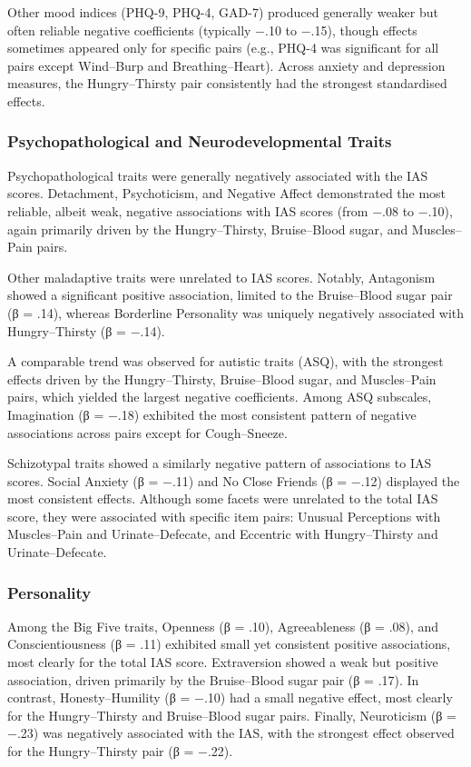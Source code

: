 \documentclass[
  jou,
  floatsintext,
  longtable,
  nolmodern,
  notxfonts,
  notimes,
  colorlinks=true,linkcolor=blue,citecolor=blue,urlcolor=blue]{apa7}
\begin{document}
Other mood indices (PHQ-9, PHQ-4, GAD-7) produced generally weaker but
often reliable negative coefficients (typically −.10 to −.15), though
effects sometimes appeared only for specific pairs (e.g., PHQ-4 was
significant for all pairs except Wind--Burp and Breathing--Heart).
Across anxiety and depression measures, the Hungry--Thirsty pair
consistently had the strongest standardised effects.

\subsubsection{Psychopathological and Neurodevelopmental
Traits}\label{psychopathological-and-neurodevelopmental-traits-1}

Psychopathological traits were generally negatively associated with the
IAS scores. Detachment, Psychoticism, and Negative Affect demonstrated
the most reliable, albeit weak, negative associations with IAS scores
(from −.08 to −.10), again primarily driven by the Hungry--Thirsty,
Bruise--Blood sugar, and Muscles--Pain pairs.

Other maladaptive traits were unrelated to IAS scores. Notably,
Antagonism showed a significant positive association, limited to the
Bruise--Blood sugar pair (β = .14), whereas Borderline Personality was
uniquely negatively associated with Hungry--Thirsty (β = −.14).

A comparable trend was observed for autistic traits (ASQ), with the
strongest effects driven by the Hungry--Thirsty, Bruise--Blood sugar,
and Muscles--Pain pairs, which yielded the largest negative
coefficients. Among ASQ subscales, Imagination (β = −.18) exhibited the
most consistent pattern of negative associations across pairs except for
Cough--Sneeze.

Schizotypal traits showed a similarly negative pattern of associations
to IAS scores. Social Anxiety (β = −.11) and No Close Friends (β = −.12)
displayed the most consistent effects. Although some facets were
unrelated to the total IAS score, they were associated with specific
item pairs: Unusual Perceptions with Muscles--Pain and
Urinate--Defecate, and Eccentric with Hungry--Thirsty and
Urinate--Defecate.

\subsubsection{Personality}\label{personality-1}

Among the Big Five traits, Openness (β = .10), Agreeableness (β = .08),
and Conscientiousness (β = .11) exhibited small yet consistent positive
associations, most clearly for the total IAS score. Extraversion showed
a weak but positive association, driven primarily by the Bruise--Blood
sugar pair (β = .17). In contrast, Honesty--Humility (β = −.10) had a
small negative effect, most clearly for the Hungry--Thirsty and
Bruise--Blood sugar pairs. Finally, Neuroticism (β = −.23) was
negatively associated with the IAS, with the strongest effect observed
for the Hungry--Thirsty pair (β = −.22).
\end{document}
